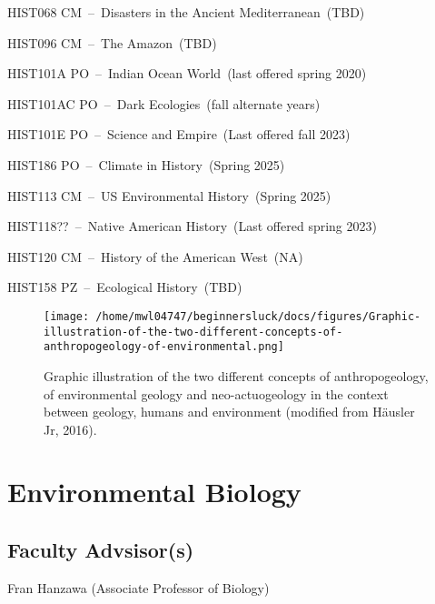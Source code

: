 \documentclass{article}\usepackage[]{graphicx}\usepackage[]{xcolor}
\newenvironment{itemize*}%
  {\begin{itemize}%
    \setlength{\itemsep}{0pt}%
    \setlength{\parskip}{0pt}}%
  {\end{itemize}}
\begin{document}
\begin{description}
\begin{itemize*}
  \item HIST068 CM~--~Disasters in the Ancient Mediterranean~(TBD)
  \item HIST096 CM~--~The Amazon~(TBD)
  \item HIST101A PO~--~Indian Ocean World~(last offered spring 2020)
  \item HIST101AC PO~--~Dark Ecologies~(fall alternate years)
  \item HIST101E PO~--~Science and Empire~(Last offered fall 2023)
  \item HIST186 PO~--~Climate in History~(Spring 2025)
  \item HIST113 CM~--~US Environmental History~(Spring 2025)
  \item HIST118??~--~Native American History~(Last offered spring 2023)
  \item HIST120 CM~--~History of the American West~(NA)
  \item HIST158 PZ~--~Ecological History~(TBD)
\end{itemize*}

\end{description}

\begin{figure}
\centering
\texttt{[image: /home/mwl04747/beginnersluck/docs/figures/Graphic-illustration-of-the-two-different-concepts-of-anthropogeology-of-environmental.png]}
\caption{Graphic illustration of the two different concepts of anthropogeology, of environmental geology and neo-actuogeology in the context between geology, humans and environment (modified from Häusler Jr, 2016).}
\end{figure}

\newpage %
\section{Environmental Biology}



\subsection{Faculty Advsisor(s)}

\begin{itemize*}
  \item Fran Hanzawa (Associate Professor of Biology)
\end{itemize*}
\end{document}
